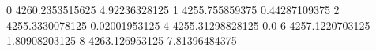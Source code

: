 0 4260.2353515625 4.92236328125
1 4255.755859375 0.44287109375
2 4255.3330078125 0.02001953125
4 4255.31298828125 0.0
6 4257.1220703125 1.80908203125
8 4263.126953125 7.81396484375
